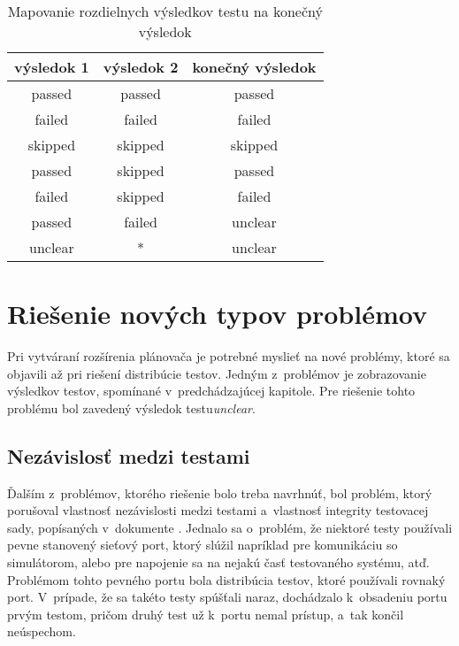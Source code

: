 \begin{table}
  \begin{center}
    \begin{tabular}{| c | c | c |}
    \hline
    výsledok 1  & výsledok 2 & konečný výsledok \\ \hline
    passed      & passed     & passed  \\ \hline
    failed      & failed     & failed  \\ \hline
    skipped     & skipped    & skipped \\ \hline
    passed      & skipped    & passed  \\ \hline
    failed      & skipped    & failed  \\ \hline
    passed      & failed     & unclear \\ \hline
    unclear     &      *     & unclear \\ \hline
    \end{tabular}
    \caption{Mapovanie rozdielnych výsledkov testu na konečný výsledok}
    \label{tabulka:vysledky_testu_prevod}
  \end{center}
\end{table}



\section{Riešenie nových typov problémov}
\label{sekcia:riesenie_novych_problemov}
Pri vytváraní rozšírenia plánovača je potrebné myslieť na nové problémy, 
ktoré sa objavili až pri riešení distribúcie testov. 
Jedným z~problémov je zobrazovanie výsledkov testov, spomínané 
v~predchádzajúcej kapitole. Pre riešenie tohto problému bol zavedený 
výsledok testu\emph{unclear}.

\subsection*{Nezávislosť medzi testami}
Ďalším z~problémov, ktorého riešenie bolo treba navrhnúť, bol problém, 
ktorý porušoval vlastnosť nezávislosti medzi testami a~vlastnosť 
integrity testovacej sady, popísaných v~dokumente \cite{Kapfhammer}.
Jednalo sa o~problém, že niektoré testy používali pevne stanovený 
sieťový port, ktorý slúžil napríklad pre komunikáciu so simulátorom, 
alebo pre napojenie sa na nejakú časť testovaného systému, atď.
Problémom tohto pevného portu bola distribúcia testov, 
ktoré používali rovnaký port. V~prípade, že sa takéto testy spúšťali naraz, 
dochádzalo k~obsadeniu portu prvým testom, pričom druhý test 
už k~portu nemal prístup, a~tak končil neúspechom.

